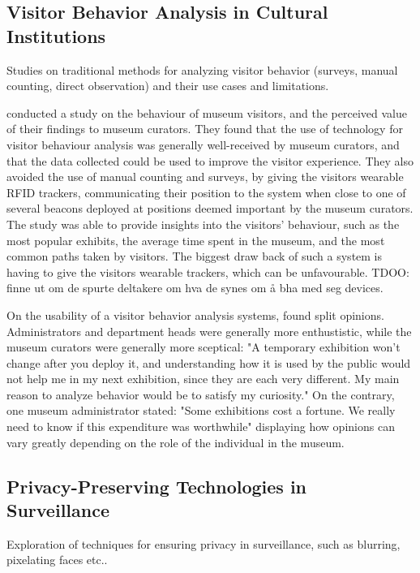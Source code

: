 \subsection{Visitor Behavior Analysis in Cultural Institutions}
Studies on traditional methods for analyzing visitor behavior (surveys, manual counting, direct observation) and their use cases and limitations.



\citeauthor{la2017museumbehaviouranalysis} conducted a study on the behaviour of museum visitors, and the perceived value of their findings to museum curators. They found that the use of technology for visitor behaviour analysis was generally well-received by museum curators, and that the data collected could be used to improve the visitor experience. They also avoided the use of manual counting and surveys, by giving the visitors wearable RFID trackers, communicating their position to the system when close to one of several beacons deployed at positions deemed important by the museum curators. The study was able to provide insights into the visitors' behaviour, such as the most popular exhibits, the average time spent in the museum, and the most common paths taken by visitors. The biggest draw back of such a system is having to give the visitors wearable trackers, which can be unfavourable. TDOO: finne ut om de spurte deltakere om hva de synes om å bha med seg devices.

On the usability of a visitor behavior analysis systems, \cite{la2017museumbehaviouranalysis} found split opinions. Administrators and department heads were generally more enthustistic, while the museum curators were generally more sceptical: "A temporary exhibition won’t
change after you deploy it, and understanding how it is used by the public would not help me in my next exhibition, since they are each very different. My main reason to analyze behavior would be to satisfy my curiosity." On the contrary, one museum administrator stated: "Some exhibitions cost a fortune. We really need to know if this expenditure was worthwhile" displaying how opinions can vary greatly depending on the role of the individual in the museum.



\subsection{Privacy-Preserving Technologies in Surveillance}
Exploration of techniques for ensuring privacy in surveillance, such as blurring, pixelating faces etc.. 

